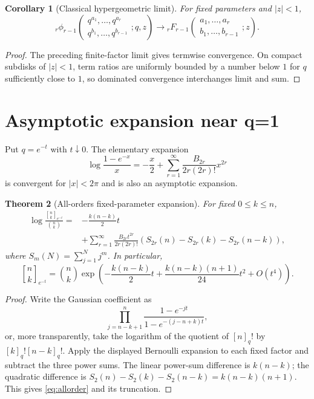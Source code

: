 \documentclass[11pt]{article}
\numberwithin{equation}{section}
\newtheorem{theorem}{Theorem}[section]
\newtheorem{corollary}[theorem]{Corollary}
\theoremstyle{definition}
\begin{document}
\begin{corollary}[Classical hypergeometric limit]
For fixed parameters and $|z|<1$,
\[
{}_{r}\phi_{r-1}\!\left(\begin{matrix}q^{a_1},\ldots,q^{a_r}\\q^{b_1},\ldots,q^{b_{r-1}}\end{matrix};q,z\right)
\longrightarrow
{}_{r}F_{r-1}\!\left(\begin{matrix}a_1,\ldots,a_r\\b_1,\ldots,b_{r-1}\end{matrix};z\right).
\]
\end{corollary}
\begin{proof}
The preceding finite-factor limit gives termwise convergence.  On compact subdisks of $|z|<1$, term ratios are uniformly bounded by a number below $1$ for $q$ sufficiently close to $1$, so dominated convergence interchanges limit and sum.
\end{proof}

\section{Asymptotic expansion near q=1}
Put $q=e^{-t}$ with $t\downarrow0$.  The elementary expansion
\[
\log\frac{1-e^{-x}}x=-\frac x2+
\sum_{r=1}^{\infty}\frac{B_{2r}}{2r(2r)!}x^{2r}
\]
is convergent for $|x|<2\pi$ and is also an asymptotic expansion.

\begin{theorem}[All-orders fixed-parameter expansion]
For fixed $0\le k\le n$,
\begin{align}
\log\frac{\genfrac{[}{]}{0pt}{}{n}{k}_{e^{-t}}}{\binom nk}
={}&-\frac{k(n-k)}2t\\
&+\sum_{r=1}^{\infty}\frac{B_{2r}t^{2r}}{2r(2r)!}
\left(S_{2r}(n)-S_{2r}(k)-S_{2r}(n-k)\right),\label{eq:allorder}
\end{align}
where $S_m(N)=\sum_{j=1}^{N}j^m$.  In particular,
\[
\genfrac{[}{]}{0pt}{}{n}{k}_{e^{-t}}
=\binom nk\exp\left(
-\frac{k(n-k)}2t+
\frac{k(n-k)(n+1)}{24}t^2+O(t^4)\right).
\]
\end{theorem}
\begin{proof}
Write the Gaussian coefficient as
\[
\prod_{j=n-k+1}^{n}\frac{1-e^{-jt}}{1-e^{-(j-n+k)t}},
\]
or, more transparently, take the logarithm of the quotient of $[n]_q!$ by $[k]_q![n-k]_q!$.  Apply the displayed Bernoulli expansion to each fixed factor and subtract the three power sums.  The linear power-sum difference is $k(n-k)$; the quadratic difference is
$S_2(n)-S_2(k)-S_2(n-k)=k(n-k)(n+1)$.  This gives \eqref{eq:allorder} and its truncation.
\end{proof}
\end{document}
